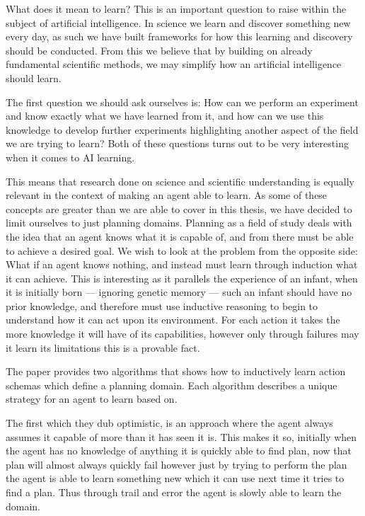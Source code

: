 \documentclass[Master.tex]{subfiles}
\begin{document}
	What does it mean to learn? This is an important question to raise within the subject of artificial intelligence.
	In science we learn and discover something new every day, as such we have built frameworks for how this learning and discovery should be conducted. From this we believe that by building on already fundamental scientific methods, we may simplify how an artificial intelligence should learn.
	
	The first question we should ask ourselves is: How can we perform an experiment and know exactly what we have learned from it, 
	and how can we use this knowledge to develop further experiments highlighting another aspect of the field we are trying to learn?
	Both of these questions turns out to be very interesting when it comes to AI learning.
	
	This means that research done on science and scientific understanding is equally relevant in the context of making an agent able to learn.
	As some of these concepts are greater than we are able to cover in this thesis, we have decided to limit ourselves to just planning domains.	 
	Planning as a field of study deals with the idea that an agent knows what it is capable of, 
	and from there must be able to achieve a desired goal. 
	We wish to look at the problem from the opposite side: What if an agent knows nothing, and instead must learn through induction what it can achieve. 
	This is interesting as it parallels the experience of an infant, when it is initially born  --- ignoring genetic memory --- such an infant should have no prior knowledge, and therefore must use inductive reasoning to begin to understand how it can act upon its environment. For each action it takes the more knowledge it will have of its capabilities, however only through failures may it learn its limitations this is a provable fact.
	 
	
	
	The \cite{Walsh2008} paper provides two algorithms that shows how to inductively learn action schemas which define a planning domain. 
	Each algorithm describes a unique strategy for an agent to learn based on. 
	
	The first which they dub optimistic, is an approach where the agent always assumes it capable of more than it has seen it is. This makes it so, initially when the agent has no knowledge of anything it is quickly able to find plan, now that plan will almost always quickly fail however just by trying to perform the plan the agent is able to learn something new which it can use next time it tries to find a plan. Thus through trail and error the agent is slowly able to learn the domain.
	
\end{document}
